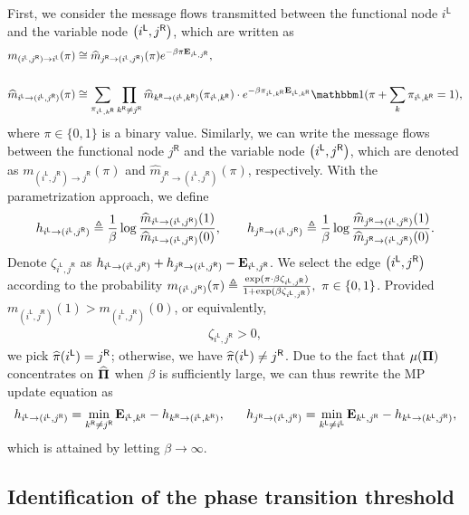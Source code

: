 \documentclass[11pt]{article}
\def \vcinfo#1#2{m_{#1\rightarrow #2}}
\def \cvinfo#1#2{\hat{m}_{#1\rightarrow #2}}
\def\ln#1{{#1}^{\mathsf{L}}}
\def\rn#1{{#1}^{\mathsf{R}}}
\def\lloginfo#1#2{h_{\ln{#1}\rightarrow (\ln{#1}, \rn{#2})}}
\def\rloginfo#1#2{h_{\rn{#2}\rightarrow (\ln{#1}, \rn{#2})}}
\begin{document}
First, we consider the message flows
transmitted between the
functional node $\ln{i}$ and the variable
node $\bracket{\ln{i}, \rn{j}}$, which are
written as
\begin{align}
\label{eq:mp_left_wise}
\vcinfo{(\ln{i}, \rn{j})}{\ln{i}}(\pi)  & \cong \cvinfo{\rn{j}}{(\ln{i}, \rn{j})}(\pi) e^{-\beta \pi \bE_{\ln{i}, \rn{j}}}  , \notag \\\notag \\
\cvinfo{\ln{i}}{(\ln{i}, \rn{j})}(\pi)
 & \cong \sum_{\pi_{\ln{i}, \rn{k}}} \prod_{\rn{k}\neq \rn{j}}
 \cvinfo{\rn{k}}{(\ln{i}, \rn{k})}(\pi_{\ln{i}, \rn{k}}) \cdot e^{-\beta\pi_{\ln{i}, \rn{k}} \bE_{\ln{i}, \rn{k}}}
 \Ind(\pi + \sum_k \pi_{\ln{i}, \rn{k}} = 1),
\end{align}
where $\pi \in \{0, 1\}$ is a binary value.
Similarly, we can write the message flows
between the functional node $\rn{j}$ and
the variable node $\bracket{\ln{i}, \rn{j}}$, which are denoted as $\vcinfo{(\ln{i}, \rn{j})}{\rn{j}}(\pi)$ and
$\cvinfo{\rn{j}}{(\ln{i}, \rn{j})}(\pi)$, respectively.
With the parametrization approach, we define
\[
\lloginfo{i}{j} \defequal \frac{1}{\beta}\log \frac{\cvinfo{\ln{i}}{(\ln{i}, \rn{j})}(1)}{\cvinfo{\ln{i}}{(\ln{i}, \rn{j})}(0)}, ~~~~~~ \rloginfo{i}{j} \defequal \frac{1}{\beta}\log \frac{\cvinfo{\rn{j}}{(\ln{i}, \rn{j})}(1)}{\cvinfo{\rn{j}}{(\ln{i}, \rn{j})}(0)}.
\]
Denote $\zeta_{\ln{i}, \rn{j}}$ as
$ \lloginfo{i}{j} + \rloginfo{i}{j} -  \bE_{\ln{i}, \rn{j}}$. We select the edge
$\bracket{\ln{i}, \rn{j}}$ according to the probability
$m_{(\ln{i}, \rn{j})}(\pi) \defequal
\frac{\exp(\pi\cdot \beta\zeta_{\ln{i}, \rn{j}}) }{1 + \exp(\beta  \zeta_{\ln{i}, \rn{j}} )},~\pi \in \set{0, 1}$.
Provided $m_{(\ln{i}, \rn{j})}(1) > m_{(\ln{i}, \rn{j})}(0)$,
or equivalently,
\begin{align}
\label{eq:mp_edge_select}
\zeta_{\ln{i}, \rn{j}}> 0,
\end{align}
we pick $\wh{\pi}(\ln{i}) = \rn{j}$;
otherwise, we have $\wh{\pi}(\ln{i}) \neq \rn{j}$.
Due to the fact that $\mu(\boldsymbol{\Pi})$ concentrates on
$\widehat{\boldsymbol{\Pi}}$ when $\beta$ is sufficiently large, we can
thus rewrite the MP update equation as
\begin{align}
\label{eq:mp_loginfo_beta_inf}
\lloginfo{i}{j} =  \min_{\rn{k}\neq \rn{j}}
\bE_{\ln{i}, \rn{k}} - \rloginfo{i}{k}, ~~~~~
\rloginfo{i}{j} = \min_{\ln{k}\neq \ln{i}}
\bE_{\ln{k}, \rn{j}} - \lloginfo{k}{j},
\end{align}
which is attained by letting $\beta\rightarrow \infty$.


\subsection{Identification of the phase transition threshold}
\label{sec:mp_density_evolve}
\end{document}
